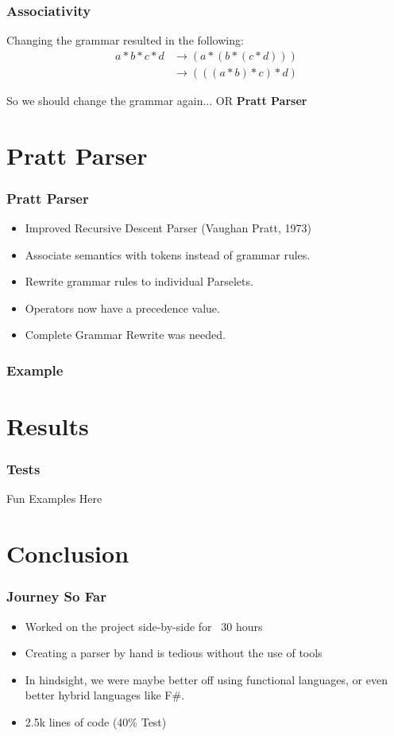 \documentclass{beamer}
\begin{document}
\begin{frame}
    \frametitle{Associativity}
    Changing the grammar resulted in the following:
    \begin{align*}
    a * b * c * d &\rightarrow (a * (b * (c * d))) \\
                  &\rightarrow (((a * b) * c) * d)
    \end{align*}
  
    So we should change the grammar again... OR \textbf{Pratt Parser}
\end{frame}

\section{Pratt Parser}

\begin{frame}
    \frametitle{Pratt Parser}

    \begin{itemize}
        \item Improved Recursive Descent Parser (Vaughan Pratt, 1973)
        \item Associate semantics with tokens instead of grammar rules.
        \item Rewrite grammar rules to individual Parselets.
        \item Operators now have a precedence value.
        \item Complete Grammar Rewrite was needed.
    \end{itemize}
\end{frame}

\begin{frame}
    \frametitle{Example}
    
\end{frame}


\section{Results}

\begin{frame}
    \frametitle{Tests}
    Fun Examples Here
\end{frame}

\section{Conclusion}

\begin{frame}
    \frametitle{Journey So Far}
    
    \begin{itemize}
        \item Worked on the project side-by-side for ~30 hours
        \item Creating a parser by hand is tedious without the use of tools
        \item In hindsight, we were maybe better off using functional languages, or even better hybrid languages like F\#.
        \item 2.5k lines of code (40\% Test)
    \end{itemize}
\end{frame}
\end{document}
